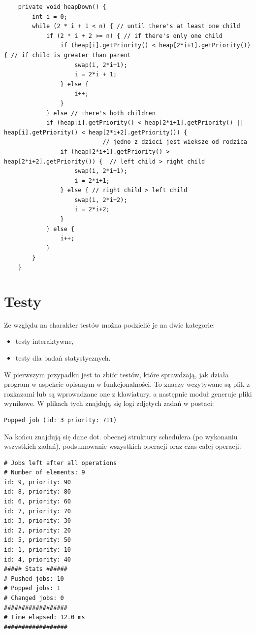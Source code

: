 \documentclass[12pt,a4paper]{article}
\begin{document}
\begin{lstlisting}
    private void heapDown() {
        int i = 0;
        while (2 * i + 1 < n) { // until there's at least one child
            if (2 * i + 2 >= n) { // if there's only one child
                if (heap[i].getPriority() < heap[2*i+1].getPriority()) { // if child is greater than parent
                    swap(i, 2*i+1);
                    i = 2*i + 1;
                } else {
                    i++;
                }
            } else // there's both children
            if (heap[i].getPriority() < heap[2*i+1].getPriority() || heap[i].getPriority() < heap[2*i+2].getPriority()) {
							// jedno z dzieci jest wieksze od rodzica
                if (heap[2*i+1].getPriority() > heap[2*i+2].getPriority()) {  // left child > right child
                    swap(i, 2*i+1);
                    i = 2*i+1;
                } else { // right child > left child
                    swap(i, 2*i+2);
                    i = 2*i+2;
                }
            } else {
                i++;
            }
        }
    }
\end{lstlisting}


\section{Testy}

Ze względu na charakter testów można podzielić je na dwie kategorie:

\begin{itemize}
	\item testy interaktywne,
	\item testy dla badań statystycznych.
\end{itemize}

W pierwszym przypadku jest to zbiór testów, które sprawdzają, jak działa program w aspekcie opisanym w funkcjonalności. To znaczy wczytywane są plik z rozkazami lub są wprowadzane one z klawiatury, a następnie moduł generuje pliki wynikowe. W plikach tych znajdują się logi zdjętych zadań w postaci:

\begin{lstlisting}
Popped job (id: 3 priority: 711)
\end{lstlisting}

Na końcu znajdują się dane dot. obecnej struktury schedulera (po wykonaniu wszystkich zadań), podsumowanie wszystkich operacji oraz czas całej operacji:

\begin{lstlisting}
# Jobs left after all operations
# Number of elements: 9
id: 9, priority: 90
id: 8, priority: 80
id: 6, priority: 60
id: 7, priority: 70
id: 3, priority: 30
id: 2, priority: 20
id: 5, priority: 50
id: 1, priority: 10
id: 4, priority: 40
##### Stats ######
# Pushed jobs: 10
# Popped jobs: 1
# Changed jobs: 0
##################
# Time elapsed: 12.0 ms
##################
\end{lstlisting}
\end{document}

